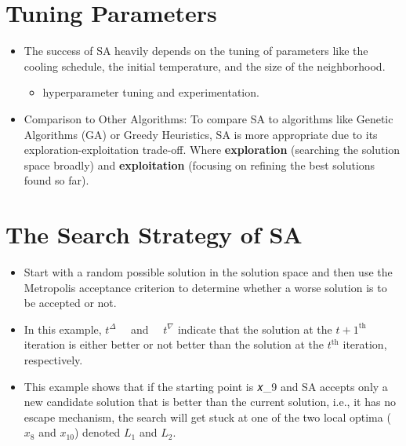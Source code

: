 \documentclass[
  letterpaper,
  DIV=11,
  numbers=noendperiod]{scrreprt}
\providecommand{\tightlist}{%
  \setlength{\itemsep}{0pt}\setlength{\parskip}{0pt}}\usepackage{longtable,booktabs,array}
\begin{document}
\section{Tuning Parameters}\label{tuning-parameters}

\begin{itemize}
\tightlist
\item
  The success of SA heavily depends on the tuning of parameters like the
  cooling schedule, the initial temperature, and the size of the
  neighborhood.

  \begin{itemize}
  \tightlist
  \item
    hyperparameter tuning and experimentation.
  \end{itemize}
\item
  Comparison to Other Algorithms: To compare SA to algorithms like
  Genetic Algorithms (GA) or Greedy Heuristics, SA is more appropriate
  due to its exploration-exploitation trade-off. Where
  \textbf{exploration} (searching the solution space broadly) and
  \textbf{exploitation} (focusing on refining the best solutions found
  so far).
\end{itemize}

\section{The Search Strategy of SA}\label{the-search-strategy-of-sa}

\begin{itemize}
\tightlist
\item
  Start with a random possible solution in the solution space and then
  use the Metropolis acceptance criterion to determine whether a worse
  solution is to be accepted or not.
\item
  In this example, \(t^{\Delta} \quad\) and \(\quad t^{\nabla}\)
  indicate that the solution at the \(t+1^{\text{th}}\) iteration is
  either better or not better than the solution at the \(t^{\text{th}}\)
  iteration, respectively.
\item
  This example shows that if the starting point is 𝑥\_9 and SA accepts
  only a new candidate solution that is better than the current
  solution, i.e., it has no escape mechanism, the search will get stuck
  at one of the two local optima (\(x_8\) and \(x_10\)) denoted \(L_1\)
  and \(L_2\).
\end{itemize}
\end{document}
